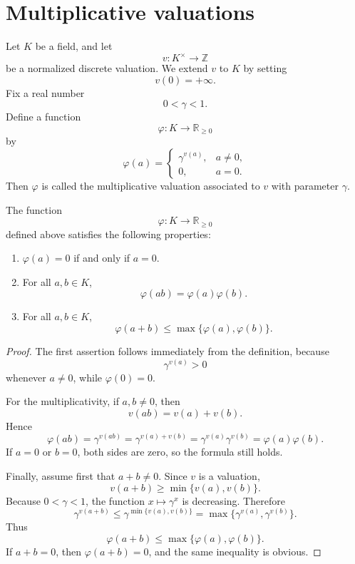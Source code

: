 \section{Multiplicative valuations}

\begin{definition}
    Let \(K\) be a field, and let
    \[
        v:K^\times\longrightarrow \mathbb{Z}
    \]
    be a normalized discrete valuation. We extend \(v\) to \(K\) by setting
    \[
        v(0)=+\infty.
    \]
    Fix a real number
    \[
        0<\gamma<1.
    \]
    Define a function
    \[
        \varphi:K\longrightarrow \mathbb{R}_{\geq 0}
    \]
    by
    \[
        \varphi(a)=
        \begin{cases}
            \gamma^{v(a)}, & a\neq 0,\\
            0, & a=0.
        \end{cases}
    \]
    Then \(\varphi\) is called the multiplicative valuation associated to \(v\)
    with parameter \(\gamma\).
\end{definition}

\begin{proposition}
    The function
    \[
        \varphi:K\longrightarrow \mathbb{R}_{\geq 0}
    \]
    defined above satisfies the following properties:
    \begin{enumerate}
        \item \(\varphi(a)=0\) if and only if \(a=0\).
        \item For all \(a,b\in K\),
              \[
                  \varphi(ab)=\varphi(a)\varphi(b).
              \]
        \item For all \(a,b\in K\),
              \[
                  \varphi(a+b)\leq \max\{\varphi(a),\varphi(b)\}.
              \]
    \end{enumerate}
\end{proposition}

\begin{proof}
    The first assertion follows immediately from the definition, because
    \[
        \gamma^{v(a)}>0
    \]
    whenever \(a\neq 0\), while \(\varphi(0)=0\).

    For the multiplicativity, if \(a,b\neq 0\), then
    \[
        v(ab)=v(a)+v(b).
    \]
    Hence
    \[
        \varphi(ab)
        =
        \gamma^{v(ab)}
        =
        \gamma^{v(a)+v(b)}
        =
        \gamma^{v(a)}\gamma^{v(b)}
        =
        \varphi(a)\varphi(b).
    \]
    If \(a=0\) or \(b=0\), both sides are zero, so the formula still holds.

    Finally, assume first that \(a+b\neq 0\). Since \(v\) is a valuation,
    \[
        v(a+b)\geq \min\{v(a),v(b)\}.
    \]
    Because \(0<\gamma<1\), the function \(x\mapsto \gamma^x\) is decreasing.
    Therefore
    \[
        \gamma^{v(a+b)}
        \leq
        \gamma^{\min\{v(a),v(b)\}}
        =
        \max\{\gamma^{v(a)},\gamma^{v(b)}\}.
    \]
    Thus
    \[
        \varphi(a+b)\leq \max\{\varphi(a),\varphi(b)\}.
    \]
    If \(a+b=0\), then \(\varphi(a+b)=0\), and the same inequality is obvious.
\end{proof}

